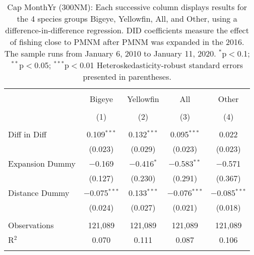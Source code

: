 
\begin{table}[!htbp] \centering 
  \caption{Cap MonthYr (300NM): Each successive column displays results for the 4 species groups Bigeye, Yellowfin, All, and Other, using a difference-in-difference regression. DID coefficients measure the effect of fishing close to PMNM after PMNM was expanded in the 2016. The sample runs from January 6, 2010 to January 11, 2020. $^{*}$p$<$0.1; $^{**}$p$<$0.05; $^{***}$p$<$0.01 Heteroskedasticity-robust standard errors presented in parentheses.} 
  \label{tbl:timeFE300NM} 
\begin{tabular}{@{\extracolsep{5pt}}lcccc} 
\\[-1.8ex]\hline 
\hline \\[-1.8ex] 
 & Bigeye & Yellowfin & All & Other \\ 
\\[-1.8ex] & (1) & (2) & (3) & (4)\\ 
\hline \\[-1.8ex] 
 Diff in Diff & 0.109$^{***}$ & 0.132$^{***}$ & 0.095$^{***}$ & 0.022 \\ 
  & (0.023) & (0.029) & (0.023) & (0.023) \\ 
  Expansion Dummy & $-$0.169 & $-$0.416$^{*}$ & $-$0.583$^{**}$ & $-$0.571 \\ 
  & (0.127) & (0.230) & (0.291) & (0.367) \\ 
  Distance Dummy & $-$0.075$^{***}$ & 0.133$^{***}$ & $-$0.076$^{***}$ & $-$0.085$^{***}$ \\ 
  & (0.024) & (0.027) & (0.021) & (0.018) \\ 
 \hline \\[-1.8ex] 
Observations & 121,089 & 121,089 & 121,089 & 121,089 \\ 
R$^{2}$ & 0.070 & 0.111 & 0.087 & 0.106 \\ 
\hline 
\hline \\[-1.8ex] 
\end{tabular} 
\end{table} 
